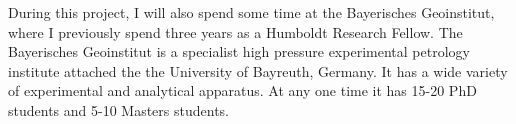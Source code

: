 \documentclass[11pt,twoside,a4paper]{article}
\begin{document}
During this project, I will also spend some time at the Bayerisches Geoinstitut, where I previously spend three years as a Humboldt Research Fellow. The Bayerisches Geoinstitut is a specialist high pressure experimental petrology institute attached the the University of Bayreuth, Germany. It has a wide variety of experimental and analytical apparatus. At any one time it has 15-20 PhD students and 5-10 Masters students. 





\end{document}
